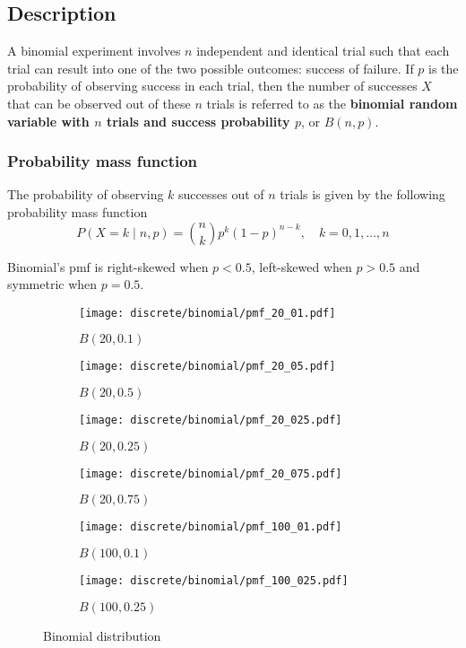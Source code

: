 \subsection{Description}
A binomial experiment involves $n$ independent and identical trial such that each trial can result into one of the two possible outcomes: success of failure. If $p$ is the probability of observing success in each trial, then the number of successes $X$ that can be observed out of these $n$ trials is referred to as the \textbf{binomial random variable with $n$ trials and success probability $p$}, or $B(n, p)$.

\subsubsection{Probability mass function}
The probability of observing $k$ successes out of $n$ trials is given by the following probability mass function
\[
	P(X = k \mid n, p) = \binom{n}{k}p^{k}(1 - p)^{n - k}, \quad k = 0, 1, \ldots, n
\]

Binomial's pmf is right-skewed when $p < 0.5$, left-skewed when $p > 0.5$ and symmetric when $p = 0.5$.

\begin{figure}[H]
	\centering
	\begin{subfigure}[b]{0.45\textwidth}
		\texttt{[image: discrete/binomial/pmf\_20\_01.pdf]}
		\caption{$B(20, 0.1)$}
		\label{fig:B(20,0.1)}
	\end{subfigure}
	\begin{subfigure}[b]{0.45\textwidth}
	\texttt{[image: discrete/binomial/pmf\_20\_05.pdf]}
	\caption{$B(20, 0.5)$}
	\label{fig:B(20,0.5)}
	\end{subfigure}
	\begin{subfigure}[b]{0.45\textwidth}
		\texttt{[image: discrete/binomial/pmf\_20\_025.pdf]}
		\caption{$B(20, 0.25)$}
		\label{fig:B(20,0.25)}
	\end{subfigure}
	\begin{subfigure}[b]{0.45\textwidth}
		\texttt{[image: discrete/binomial/pmf\_20\_075.pdf]}
		\caption{$B(20, 0.75)$}
		\label{fig:B(20,0.75)}
	\end{subfigure}
	\begin{subfigure}[b]{0.45\textwidth}
		\texttt{[image: discrete/binomial/pmf\_100\_01.pdf]}
		\caption{$B(100, 0.1)$}
		\label{fig:B(100,0.1)}
	\end{subfigure}
	\begin{subfigure}[b]{0.45\textwidth}
		\texttt{[image: discrete/binomial/pmf\_100\_025.pdf]}
		\caption{$B(100, 0.25)$}
		\label{fig:B(100,0.25)}
	\end{subfigure}
	\caption{Binomial distribution}\label{fig:binomial}
\end{figure}

